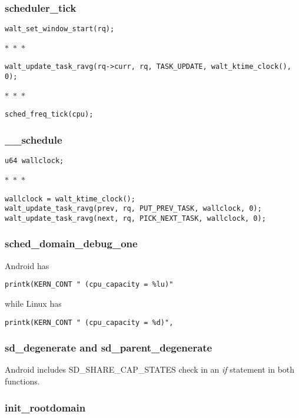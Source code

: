 \documentclass{article}
\newcommand{\divider}{{\begin{center}
  $\ast$~$\ast$~$\ast$
\end{center}}}
\begin{document}
\subsubsection{scheduler\_tick}

\begin{verbatim}
walt_set_window_start(rq);
\end{verbatim}
\divider
\begin{verbatim}
walt_update_task_ravg(rq->curr, rq, TASK_UPDATE, walt_ktime_clock(), 0);
\end{verbatim}
\divider
\begin{verbatim}
sched_freq_tick(cpu);
\end{verbatim}

\subsubsection{\_\_schedule}

\begin{verbatim}
u64 wallclock;
\end{verbatim}
\divider
\begin{verbatim}
wallclock = walt_ktime_clock();
walt_update_task_ravg(prev, rq, PUT_PREV_TASK, wallclock, 0);
walt_update_task_ravg(next, rq, PICK_NEXT_TASK, wallclock, 0);
\end{verbatim}

\subsubsection{sched\_domain\_debug\_one}

Android has
\begin{verbatim}
printk(KERN_CONT " (cpu_capacity = %lu)"
\end{verbatim}

while Linux has
\begin{verbatim}
printk(KERN_CONT " (cpu_capacity = %d)",
\end{verbatim}

\subsubsection{sd\_degenerate and sd\_parent\_degenerate}

Android includes SD\_SHARE\_CAP\_STATES check in an \textit{if} statement in both functions.

\subsubsection{init\_rootdomain}
\end{document}
